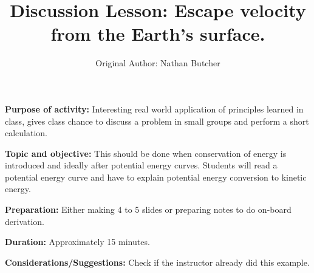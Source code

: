 \documentclass{article}
\title{Discussion Lesson: Escape velocity from the Earth's surface.}
\author{Original Author: Nathan Butcher}
\date{}
\begin{document}
\maketitle
\thispagestyle{empty}

\textbf{Purpose of activity:} Interesting real world application of principles learned in class, gives class chance to discuss a problem in small groups and perform a short calculation.

\textbf{Topic and objective:} This should be done when conservation of energy is introduced and ideally after potential energy curves. Students will read a potential energy curve and have to explain potential energy conversion to kinetic energy.

\textbf{Preparation:} Either making 4 to 5 slides or preparing notes to do on-board derivation. 

\textbf{Duration:} Approximately 15 minutes. 

\textbf{Considerations/Suggestions:} Check if the instructor already did this example.

\hspace{14pt}
\end{document}

